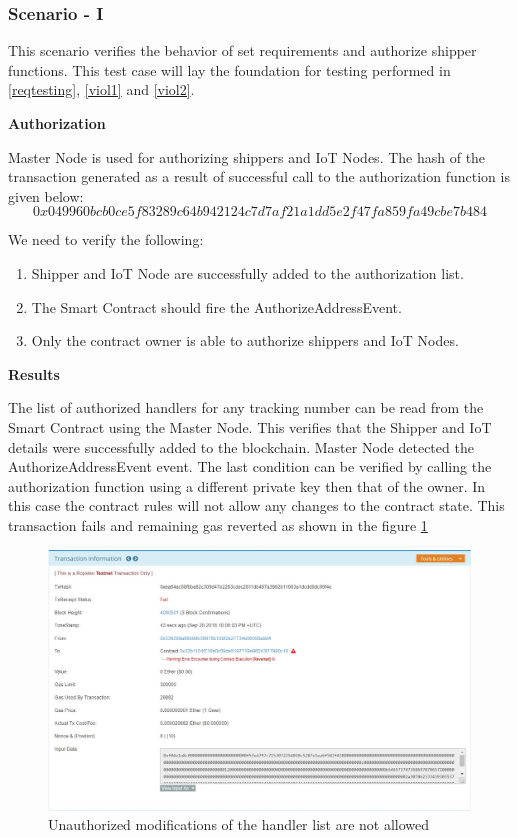 \subsubsection{Scenario - I}\label{authtesting}
This scenario verifies the behavior of set requirements and authorize shipper functions. This test case will lay the foundation for testing performed in \ref{reqtesting}, \ref{viol1} and \ref{viol2}.

\textbf{Authorization}

Master Node is used for authorizing shippers and IoT Nodes. The hash of the transaction generated as a result of successful call to the authorization function is given below:
\[0x049960bcb0ce5f83289c64b942124c7d7af21a1dd5e2f47fa859fa49cbe7b484\]

We need to verify the following:
\begin{enumerate}
\item Shipper and IoT Node are successfully added to the authorization list.
\item The Smart Contract should fire the AuthorizeAddressEvent. 
\item Only the contract owner is able to authorize shippers and IoT Nodes.
\end{enumerate}

\textbf{Results} 

The list of authorized handlers for any tracking number can be read from the Smart Contract using the Master Node. This verifies that the Shipper and IoT details were successfully added to the blockchain. Master Node detected the AuthorizeAddressEvent event.  The last condition can be verified by calling the authorization function using a different private key then that of the owner. In this case the contract rules will not allow any changes to the contract state. This transaction fails and remaining gas reverted as shown in the figure \ref{fig:AuthorizingHandler}
\vspace{1mm}
\begin{figure}[h]
	\centering
    \includegraphics[width=170mm,scale=1]{figs/AuthorizingHandler}
	\caption{Unauthorized modifications of the handler list are not allowed}
	\label{fig:AuthorizingHandler} 
\end{figure}

